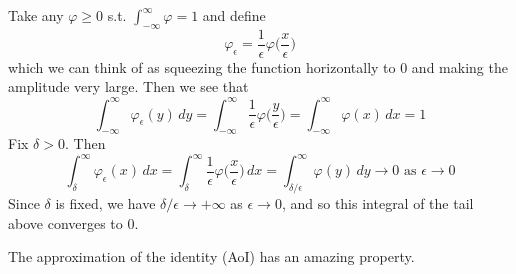   \begin{example}
    Take any $\varphi \geq 0$ s.t. $\int_{-\infty}^\infty \varphi = 1$ and define 
    \begin{equation}
      \varphi_\epsilon = \frac{1}{\epsilon} \varphi \bigg( \frac{x}{\epsilon} \bigg)
    \end{equation}
    which we can think of as squeezing the function horizontally to $0$ and making the amplitude very large. Then we see that 
    \begin{equation}
      \int_{-\infty}^{\infty} \varphi_\epsilon (y) \,dy = \int_{-\infty}^{\infty} \frac{1}{\epsilon} \varphi \bigg(\frac{y}{\epsilon} \bigg) = \int_{-\infty}^\infty \varphi(x) \,dx = 1
    \end{equation}
    Fix $\delta > 0$. Then 
    \begin{equation}
      \int_\delta^{\infty} \varphi_\epsilon (x) \,dx = \int_\delta^\infty \frac{1}{\epsilon} \varphi \bigg( \frac{x}{\epsilon} \bigg) \,dx = \int_{\delta/\epsilon}^\infty \varphi(y) \,dy \to 0 \text{ as } \epsilon \to 0
    \end{equation}
    Since $\delta$ is fixed, we have $\delta/\epsilon \to +\infty$ as $\epsilon \to 0$, and so this integral of the tail above converges to $0$.  
  \end{example} 

  The approximation of the identity (AoI) has an amazing property. 

